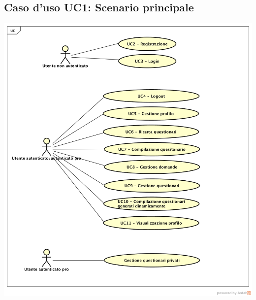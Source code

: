 \subsection{Caso d'uso UC1: Scenario principale}
\begin{center}
\includegraphics[scale=0.5]{UML/UC1.png}
\end{center}
